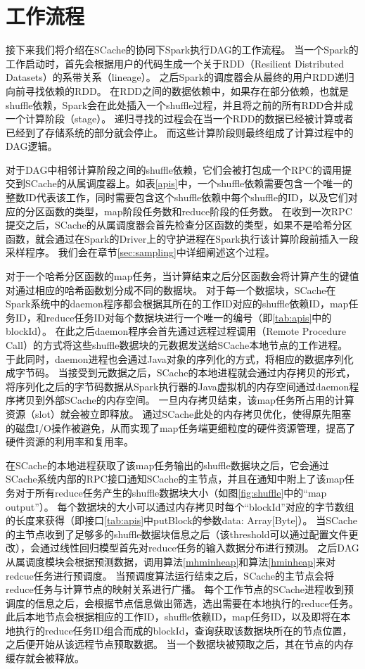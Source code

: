 \section{工作流程}

接下来我们将介绍在SCache的协同下Spark执行DAG的工作流程。
当一个Spark的工作启动时，首先会根据用户的代码生成一个关于RDD（Resilient Distributed Datasets）的系带关系（lineage）。
之后Spark的调度器会从最终的用户RDD递归向前寻找依赖的RDD。
在RDD之间的数据依赖中，如果存在部分依赖，也就是shuffle依赖，Spark会在此处插入一个shuffle过程，并且将之前的所有RDD合并成一个计算阶段（stage）。
递归寻找的过程会在当一个RDD的数据已经被计算或者已经到了存储系统的部分就会停止。
而这些计算阶段则最终组成了计算过程中的DAG逻辑。

对于DAG中相邻计算阶段之间的shuffle依赖，它们会被打包成一个RPC的调用提交到SCache的从属调度器上。如表\ref{apis}中，一个shuffle依赖需要包含一个唯一的整数ID代表该工作，同时需要包含这个shuffle依赖中每个shuffle的ID，以及它们对应的分区函数的类型，map阶段任务数和reduce阶段的任务数。
在收到一次RPC提交之后，SCache的从属调度器会首先检查分区函数的类型，如果不是哈希分区函数，就会通过在Spark的Driver上的守护进程在Spark执行该计算阶段前插入一段采样程序。
我们会在章节\ref{sec:sampling}中详细阐述这个过程。

对于一个哈希分区函数的map任务，当计算结束之后分区函数会将计算产生的键值对通过相应的哈希函数划分成不同的数据块。
对于每一个数据块，SCache在Spark系统中的daemon程序都会根据其所在的工作ID对应的shuffle依赖ID，map任务ID，和reduce任务ID对每个数据块进行一个唯一的编号（即\ref{tab:apis}中的blockId）。
在此之后daemon程序会首先通过远程过程调用（Remote Procedure Call）的方式将这些shuffle数据块的元数据发送给SCache本地节点的工作进程。
于此同时，daemon进程也会通过Java对象的序列化的方式，将相应的数据序列化成字节码。
当接受到元数据之后，SCache的本地进程就会通过内存拷贝的形式，将序列化之后的字节码数据从Spark执行器的Java虚拟机的内存空间通过daemon程序拷贝到外部SCache的内存空间。
一旦内存拷贝结束，该map任务所占用的计算资源（slot）就会被立即释放。
通过SCache此处的内存拷贝优化，使得原先阻塞的磁盘I/O操作被避免，从而实现了map任务端更细粒度的硬件资源管理，提高了硬件资源的利用率和复用率。

在SCache的本地进程获取了该map任务输出的shuffle数据块之后，它会通过SCache系统内部的RPC接口通知SCache的主节点，并且在通知中附上了该map任务对于所有reduce任务产生的shuffle数据块大小（如图\ref{fig:shuffle}中的“map output”）。
每个数据块的大小可以通过内存拷贝时每个“blockId”对应的字节数组的长度来获得（即接口\ref{tab:apis}中putBlock的参数data: Array[Byte]）。
当SCache的主节点收到了足够多的shuffle数据块信息之后（该threshold可以通过配置文件更改），会通过线性回归模型首先对reduce任务的输入数据分布进行预测。
之后DAG从属调度模块会根据预测数据，调用算法\ref{mhminheap}和算法\ref{hminheap}来对redcue任务进行预调度。
当预调度算法运行结束之后，SCache的主节点会将reduce任务与计算节点的映射关系进行广播。
每个工作节点的SCache进程收到预调度的信息之后，会根据节点信息做出筛选，选出需要在本地执行的reduce任务。
此后本地节点会根据相应的工作ID，shuffle依赖ID，map任务ID，以及即将在本地执行的reduce任务ID组合而成的blockId，查询获取该数据块所在的节点位置，之后便开始从该远程节点预取数据。
当一个数据块被预取之后，其在节点的内存缓存就会被释放。

